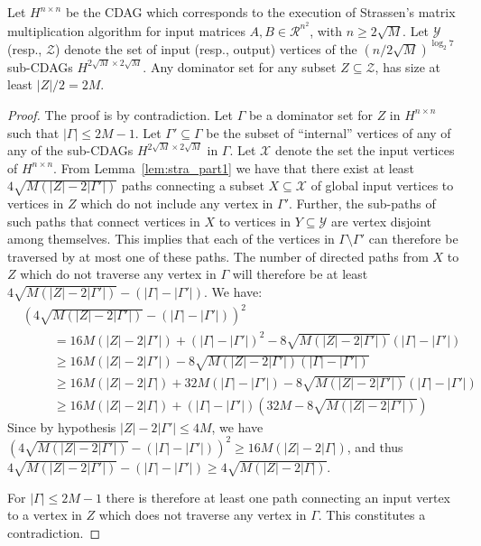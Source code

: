 \documentclass[a4paper,UKenglish]{lipics-v2016}
\newcommand{\ri}{\mathcal{R}}
\begin{document}
\begin{lemma}\label{lem:stra_part2}
Let $H^{n\times n}$ be the CDAG which corresponds to the execution of Strassen's matrix multiplication algorithm for input matrices $A,B \in \ri^{n^2}$, with $n\geq 2\sqrt{M}$. Let $\mathcal{Y}$ (resp., $\mathcal{Z}$) denote the set of input (resp., output) vertices of the $\left(n/2\sqrt{M}\right)^{\log_2 7}$ sub-CDAGs $H^{2\sqrt{M}\times 2\sqrt{M}}$. Any dominator set for any subset $Z\subseteq \mathcal{Z}$, has size at least $|Z|/2 = 2M$.
\end{lemma}
\begin{proof}
	The proof is by contradiction. Let $\Gamma$ be a dominator set for $Z$ in $H^{n\times n}$ such that $|\Gamma|\leq 2M-1$. 
	Let $\Gamma'\subseteq \Gamma$ be the subset of ``internal'' vertices of any of any of the sub-CDAGs $H^{2\sqrt{M}\times 2\sqrt{M}}$ in $\Gamma$.	Let $\mathcal{X}$ denote the set the input vertices of $H^{n\times n}$. From Lemma~\ref{lem:stra_part1} we have that there exist at least $4\sqrt{M\left(|Z|-2|\Gamma'|\right)}$  paths connecting a subset $X \subseteq \mathcal{X}$ of global input vertices to vertices in $Z$ which do not include any vertex in $\Gamma'$. Further, the sub-paths of such paths that connect vertices in $X$ to vertices in $Y\subseteq \mathcal{Y}$ are vertex disjoint among themselves. This implies that each of the vertices in $\Gamma\setminus\Gamma'$  can therefore be traversed by at most one of these paths. The number of directed paths from $X$ to $Z$ which do not traverse any vertex in $\Gamma$ will therefore be at least $4\sqrt{M\left(|Z|-2|\Gamma'|\right)} - \left(|\Gamma| - |\Gamma'|\right)$. We have:
\begin{align*}
		& \left(4\sqrt{M\left(|Z|-2|\Gamma'|\right)} - \left(|\Gamma| - |\Gamma'|\right)\right)^2 \\
		&\ \ \ \ \ \ \ \ \ \ \ = 16 M \left(|Z|-2|\Gamma'|\right) + \left(|\Gamma| - |\Gamma'|\right)^2 - 8\sqrt{M\left(|Z|-2|\Gamma'|\right)}\left(|\Gamma| - |\Gamma'|\right) \\
		&\ \ \ \ \ \ \ \ \ \ \ \geq 16 M \left(|Z|-2|\Gamma'|\right) - 8\sqrt{M\left(|Z|-2|\Gamma'|\right)\left(|\Gamma| - |\Gamma'|\right)} \\
		&\ \ \ \ \ \ \ \ \ \ \ \geq 16 M \left(|Z|-2|\Gamma|\right) + 32 M \left(|\Gamma| - |\Gamma'|\right) - 8\sqrt{M\left(|Z|-2|\Gamma'|\right)}\left(|\Gamma| - |\Gamma'|\right) \\
		&\ \ \ \ \ \ \ \ \ \ \ \geq 16 M \left(|Z|-2|\Gamma|\right) +\left(|\Gamma| - |\Gamma'|\right) \left(32M - 8\sqrt{M\left(|Z|-2|\Gamma'|\right)}\right)
	\end{align*}
Since by hypothesis $|Z|-2|\Gamma'|\leq 4M$, we have $	\left(4\sqrt{M\left(|Z|-2|\Gamma'|\right)} - \left(|\Gamma| - |\Gamma'|\right)\right)^2 \geq 16 M \left(|Z|-2|\Gamma|\right)$,
and thus $ 4\sqrt{M\left(|Z|-2|\Gamma'|\right)} - \left(|\Gamma| - |\Gamma'|\right) \geq 4\sqrt{M\left(|Z|-2|\Gamma|\right)}$.

For $|\Gamma|\leq 2M-1$ there is therefore at least one path connecting an input vertex to a vertex in $Z$ which does not traverse any vertex in $\Gamma$. This constitutes a contradiction.
\end{proof}
\end{document}

